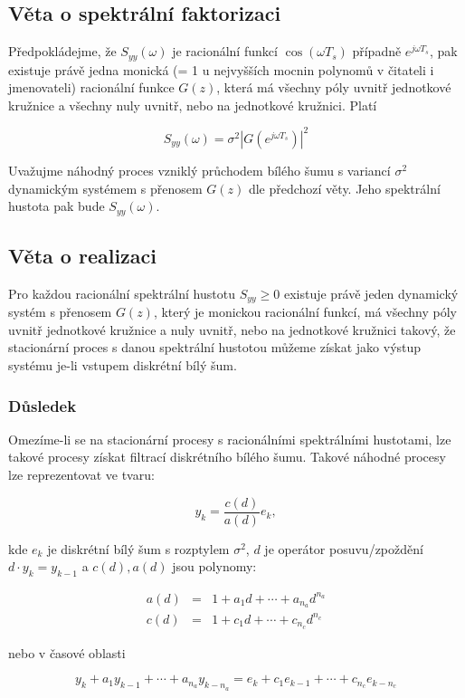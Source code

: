 \subsection{Věta o spektrální faktorizaci}

Předpokládejme, že $S_{yy}(\omega)$ je racionální funkcí $\cos(\omega T_s)$ případně $e^{j\omega T_s}$, pak existuje právě jedna monická (= 1 u nejvyšších mocnin polynomů v čitateli i jmenovateli) racionální funkce $G(z)$, která má všechny póly uvnitř jednotkové kružnice a všechny nuly uvnitř, nebo na jednotkové kružnici. Platí

\[ S_{yy}(\omega) = \sigma^2\left|G\left(e^{j\omega T_s}\right)\right|^2 \]

Uvažujme náhodný proces vzniklý průchodem bílého šumu s variancí $\sigma^2$ dynamickým systémem s přenosem $G(z)$ dle předchozí věty. Jeho spektrální hustota pak bude $S_{yy}(\omega)$.

\subsection{Věta o realizaci}
Pro každou racionální spektrální hustotu $S_{yy}\geq 0$ existuje právě jeden dynamický systém s přenosem $G(z)$, který je monickou racionální funkcí, má všechny póly uvnitř jednotkové kružnice a nuly uvnitř, nebo na jednotkové kružnici takový, že stacionární proces s danou spektrální hustotou můžeme získat jako výstup systému je-li vstupem diskrétní bílý šum.

\subsubsection{Důsledek}
Omezíme-li se na stacionární procesy s racionálními spektrálními hustotami, lze takové procesy získat filtrací diskrétního bílého šumu. Takové náhodné procesy lze reprezentovat ve tvaru:

\[ y_k = \frac{c(d)}{a(d)}e_k, \]

kde $e_k$ je diskrétní bílý šum s rozptylem $\sigma^2$, $d$ je operátor posuvu/zpoždění $d\cdot y_k=y_{k-1}$ a $c(d),a(d)$ jsou polynomy:

\begin{eqnarray*}
a(d) & = & 1 + a_1d + \cdots + a_{n_a}d^{n_a}\\
c(d) & = & 1 + c_1d + \cdots + c_{n_c}d^{n_c}
\end{eqnarray*}

nebo v časové oblasti

\[ y_k + a_1y_{k-1}+\cdots+a_{n_a}y_{k-n_a}=e_k+c_1e_{k-1}+\cdots+c_{n_c}e_{k-n_c} \]

